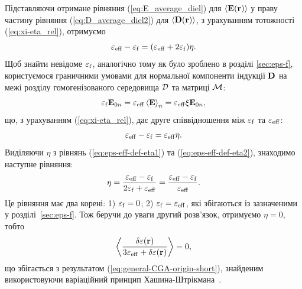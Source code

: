 \documentclass[14pt,twoside]{vakthesis}
\begin{document}
Підставляючи отримане рівняння (\ref{eq:E_average_diel}) для $\langle {\bf E}({\bf r}) \rangle$ у праву частину рівняння (\ref{eq:D_average_diel2}) для $\langle {\bf D}({\bf r}) \rangle$, з урахуванням тотожності (\ref{eq:xi-eta_rel}), отримуємо
\begin{equation}\label{eq:eps-eff-def-eta1}
\varepsilon_{\rm eff} - \varepsilon_{\rm f}
=(\varepsilon_{\rm eff} +2 \varepsilon_{\rm
	f})\eta.
\end{equation}
Щоб знайти невідоме $\varepsilon_{\rm f}$, аналогічно тому як було зроблено в розділі \ref{sec:eps-f}, користуємося граничними умовами для нормальної компоненти індукції $\bf D$ на межі розділу гомогенізованого середовища $\cal{D}$ та матриці ${\cal M}$:
$$
\varepsilon_{\rm f} {\bf E}_{0n}
= \varepsilon_{\rm eff} \left\langle {\bf E} \right\rangle_n = \varepsilon_{\rm eff} \xi {\bf E}_{0n},
$$
що, з урахуванням (\ref{eq:xi-eta_rel}), дає друге співвідношення між $\varepsilon_{\rm f}$ та $\varepsilon_{\rm eff}$:
\begin{equation}\label{eq:eps-eff-def-eta2}
\varepsilon_{\rm eff} - \varepsilon_{\rm f}
= \varepsilon_{\rm eff}\eta.
\end{equation}
Виділяючи $\eta$ з рівнянь (\ref{eq:eps-eff-def-eta1}) та (\ref{eq:eps-eff-def-eta2}), знаходимо наступне рівняння:
\begin{equation}\label{eq:eps_f_rel_homog}
\eta = \frac{\varepsilon_{\rm eff} - \varepsilon_{\rm f}}{2\varepsilon_{\rm f} + \varepsilon_{\rm eff}} = \frac{\varepsilon_{\rm eff} - \varepsilon_{\rm f}}{\varepsilon_{\rm eff}}.
\end{equation}
Це рівняння має два корені: 1) $\varepsilon_{\rm f} = 0$; 2)
$\varepsilon_{\rm f} = \varepsilon_{\rm eff}$, які збігаються із
зазначеними у розділі~\ref{sec:eps-f}. Тож беручи до уваги другий розв'язок, отримуємо $\eta = 0$, тобто
\begin{equation}\label{eq:general_diff}
\left\langle \frac{\delta\varepsilon({\bf r})}{3\varepsilon_{\rm eff} + \delta\varepsilon({\bf r})} \right\rangle = 0,
\end{equation}
що збігається з результатом (\ref{eq:general-CGA-origin-short}), знайденим використовуючи варіаційний принцип Хашина-Штрікмана~\cite{Sushko2017}.
\end{document}
